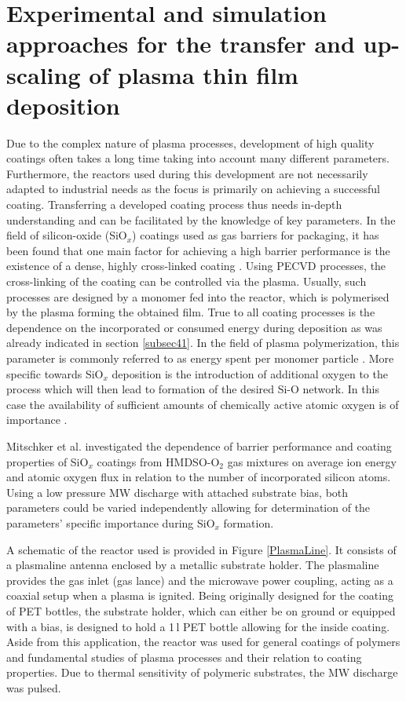 \documentclass[AMA,STIX2COL]{WileyNJD-v2} %
\begin{document}

\section{Experimental and simulation approaches for the transfer and up-scaling of plasma thin film deposition}\label{sec5}
\noindent
Due to the complex nature of plasma processes, development of high quality coatings often takes a long time taking into account many different parameters. Furthermore, the reactors used during this development are not necessarily adapted to industrial needs as the focus is primarily on achieving a successful coating. Transferring a developed coating process thus needs in-depth understanding and can be facilitated by the knowledge of key parameters. In the field of silicon-oxide (SiO$_x$) coatings used as gas barriers for packaging, it has been found that one main factor for achieving a high barrier performance is the existence of a dense, highly cross-linked coating \cite{Deilmann.2008b, Steves.2013}. Using PECVD processes, the cross-linking of the coating can be controlled via the plasma. Usually, such processes are designed by a monomer fed into the reactor, which is polymerised by the plasma forming the obtained film. True to all coating processes is the dependence on the incorporated or consumed energy during deposition as was already indicated in section \ref{subsec41}. In the field of plasma polymerization, this parameter is commonly referred to as energy spent per monomer particle \cite{Hegemann.2021, Starostin.2015, Elam.2017}. More specific towards SiO$_x$ deposition is the introduction of additional oxygen to the process which will then lead to formation of the desired Si-O network. In this case the availability of sufficient amounts of chemically active atomic oxygen is of importance \cite{Ozkaya.2015, Mitschker.2015, Mitschker.2017}.

Mitschker et al. \cite{Mitschker.2018b} investigated the dependence of barrier performance and coating properties of SiO$_x$ coatings from HMDSO-O$_2$ gas mixtures on average ion energy and atomic oxygen flux in relation to the number of incorporated silicon atoms. Using a low pressure MW discharge with attached substrate bias, both parameters could be varied independently allowing for determination of the parameters' specific importance during SiO$_x$ formation.

A schematic of the reactor used is provided in Figure \ref{PlasmaLine}. It consists of a plasmaline antenna \cite{Petasch.1997, Raeuchle.1998} enclosed by a metallic substrate holder. The plasmaline provides the gas inlet (gas lance) and the microwave power coupling, acting as a coaxial setup when a plasma is ignited. Being originally designed for the coating of PET bottles, the substrate holder, which can either be on ground or equipped with a bias, is designed to hold a 1\,l PET bottle allowing for the inside coating. Aside from this application, the reactor was used for general coatings of polymers and fundamental studies of plasma processes and their relation to coating properties. Due to thermal sensitivity of polymeric substrates, the MW discharge was pulsed.
\end{document}
